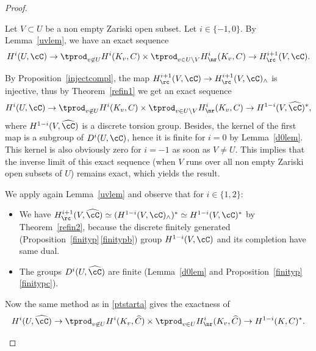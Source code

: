 \skpt
\begin{proof}
\begin{enumeratea}
\item
Let $V \subset U$ be a non empty Zariski open subset. Let
$i \in \{-1, 0\}$. By Lemma~\ref{uvlem},
we have an exact sequence\vspace*{-1pt}
\[
H^i(U,\cC) \to \tprod_{v \not \in U} H^i(K_v,C) \times
\tprod_{v \in U\setminus V} H^i_{\nr}(K_v,C) \to H^{i+1}_\rc(V,\cC).\vspace*{-3pt}
\]

By Proposition~\ref{injectcompl}, the map $H^{i+1}_\rc(V,\cC) \to
H^{i+1}_\rc(V,\cC)_{\wedge}$
is injective, thus by Theorem~\ref{refin1} we get an exact sequence\vspace*{-1pt}
\[
H^i(U,\cC) \to \tprod_{v \not \in U} H^i(K_v,C) \times
\tprod_{v \in U\setminus V} H^i_{\nr}(K_v,C) \to H^{1-i}(V,\widehat \cC)^*,\vspace*{-3pt}
\]
where $H^{1-i}(V,\widehat \cC)$ is a discrete torsion group.
Besides, the kernel of the first map
is a subgroup of $D^i(U,\cC)$, hence it is finite for $i=0$
by Lemma~\ref{d0lem}. This kernel is also obviously zero for $i=-1$ as soon
as $V \neq U$.
This implies that the inverse limit of this exact sequence
(when $V$ runs over all non empty Zariski open subsets of $U$) remains exact,
which yields the result.

\item
We apply again Lemma~\ref{uvlem} and observe that for $i \in \{1, 2\}$:
\begin{itemize}
\item
We have $H^{i+1}_\rc(V,\widehat \cC) \simeq
(H^{1-i}(V,\cC)_{\wedge})^* \simeq H^{1-i}(V,\cC)^*$ by Theorem~\ref{refin2},
because the discrete finitely generated (\cf Proposition~\ref{finityp}\,\eqref{finitypb})
group $H^{1-i}(V,\cC)$ and its completion have same dual.

\item
The groups $D^i(U,\widehat \cC)$ are finite (Lemma~\ref{d0lem} and
Proposition~\ref{finityp}\,\eqref{finitypc}).
\end{itemize}

Now the same method as in \eqref{ptstarta} gives the exactness of\vspace*{-1pt}
\[
H^i(U,\widehat \cC) \to
\tprod_{v \not \in U} H^i(K_v,\widehat C) \times \tprod_{v \in U}
H^i_{\nr}(K_v,\widehat C) \to H^{1-i}(K,C)^*.\vspace*{-3pt}
\]


\end{enumeratea}
\end{proof}
